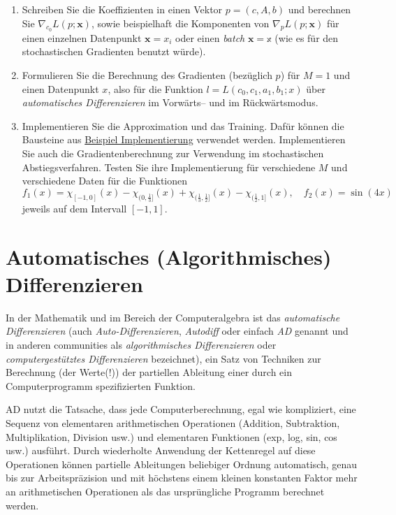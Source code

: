 \documentclass[
]{book}
\theoremstyle{definition}
\theoremstyle{definition}
\theoremstyle{definition}
\theoremstyle{definition}
\theoremstyle{remark}
\begin{document}
\begin{enumerate}
\def\labelenumi{\arabic{enumi}.}
\item
  Schreiben Sie die Koeffizienten in einen Vektor \(p=(c, A, b)\) und berechnen
  Sie \(\nabla_{c_0}L(p; \mathbf x)\), sowie beispielhaft die Komponenten
  von \(\nabla_p L(p; \mathbf x)\) für einen einzelnen Datenpunkt \(\mathbf x = x_i\) oder einen \emph{batch} \(\mathbf x = \mathbb x\) (wie es für den stochastischen
  Gradienten benutzt würde).
\item
  Formulieren Sie die Berechnung des Gradienten (bezüglich \(p\)) für
  \(M=1\) und einen Datenpunkt \(x\), also für die Funktion \(l = L(c_0, c_1, a_1, b_1; x)\) über \emph{automatisches Differenzieren} im Vorwärts-- und
  im Rückwärtsmodus.
\item
  Implementieren Sie die Approximation und das Training. Dafür können
  die Bausteine aus \protect\hyperlink{beispiel-implementierung}{Beispiel Implementierung} verwendet werden. Implementieren
  Sie auch die Gradientenberechnung zur Verwendung im stochastischen
  Abstiegsverfahren. Testen Sie ihre Implementierung für verschiedene \(M\)
  und verschiedene Daten für die Funktionen
  \begin{equation*}
  f_1(x)=\chi_{[-1, 0]}(x) - \chi_{(0, \frac 13]}(x)+ \chi_{(\frac 13, \frac 12]}(x) -
  \chi_{(\frac 12, 1]}(x), \quad f_2(x) = \sin(4x)
  \end{equation*}
  jeweils auf dem Intervall \([-1, 1]\).
\end{enumerate}

\hypertarget{automatisches-algorithmisches-differenzieren}{%
\chapter{Automatisches (Algorithmisches) Differenzieren}\label{automatisches-algorithmisches-differenzieren}}

In der Mathematik und im Bereich der Computeralgebra ist das \emph{automatische
Differenzieren} (auch \emph{Auto-Differenzieren}, \emph{Autodiff} oder einfach \emph{AD}
genannt und in anderen communities als \emph{algorithmisches Differenzieren} oder
\emph{computergestütztes Differenzieren} bezeichnet), ein Satz von Techniken zur
Berechnung (der Werte(!)) der partiellen Ableitung einer durch ein
Computerprogramm spezifizierten Funktion.

AD nutzt die Tatsache, dass jede Computerberechnung,
egal wie kompliziert, eine Sequenz von elementaren arithmetischen Operationen
(Addition, Subtraktion, Multiplikation, Division usw.) und elementaren
Funktionen (exp, log, sin, cos usw.) ausführt. Durch wiederholte Anwendung der
Kettenregel auf diese Operationen können partielle Ableitungen beliebiger
Ordnung automatisch, genau bis zur Arbeitspräzision und mit höchstens einem
kleinen konstanten Faktor mehr an arithmetischen Operationen als das
ursprüngliche Programm berechnet werden.
\end{document}
